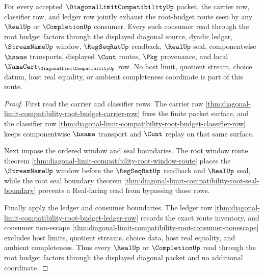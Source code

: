 \begin{theorem}
\label{thm:diagonal-limit-compatibility-root-budget-triad-exactness}
For every accepted $\DiagonalLimitCompatibilityUp$ packet, the carrier row, classifier row, and ledger row jointly exhaust the root-budget route seen by any $\RealUp$ or $\CompletionUp$ consumer. Every such consumer read through the root budget factors through the displayed diagonal source, dyadic ledger, $\StreamNameUp$ window, $\RegSeqRatUp$ readback, $\RealUp$ seal, componentwise $\hsame$ transports, displayed $\Cont$ routes, $\Pkg$ provenance, and local $\NameCert_{\DiagonalLimitCompatibilityUp}$ row. No host limit, quotient stream, choice datum, host real equality, or ambient completeness coordinate is part of this route.
\end{theorem}
\begin{proof}
First read the carrier and classifier rows. The carrier row \autoref{thm:diagonal-limit-compatibility-root-budget-carrier-row} fixes the finite packet surface, and the classifier row \autoref{thm:diagonal-limit-compatibility-root-budget-classifier-row} keeps componentwise $\hsame$ transport and $\Cont$ replay on that same surface.

Next impose the ordered window and seal boundaries. The root window route theorem \autoref{thm:diagonal-limit-compatibility-root-window-route} places the $\StreamNameUp$ window before the $\RegSeqRatUp$ readback and $\RealUp$ seal, while the root seal boundary theorem \autoref{thm:diagonal-limit-compatibility-root-seal-boundary} prevents a Real-facing read from bypassing those rows.

Finally apply the ledger and consumer boundaries. The ledger row \autoref{thm:diagonal-limit-compatibility-root-budget-ledger-row} records the exact route inventory, and consumer non-escape \autoref{thm:diagonal-limit-compatibility-root-consumer-nonescape} excludes host limits, quotient streams, choice data, host real equality, and ambient completeness. Thus every $\RealUp$ or $\CompletionUp$ read through the root budget factors through the displayed diagonal packet and no additional coordinate.
\end{proof}

